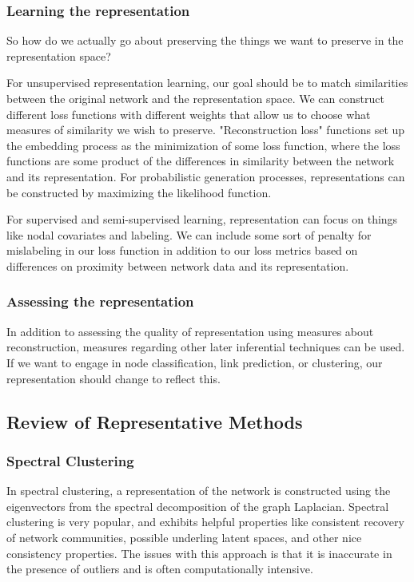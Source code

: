 \documentclass{article}
\begin{document}
\subsubsection{Learning the representation}

So how do we actually go about preserving the things we want to preserve in the representation space? 

For unsupervised representation learning, our goal should be to match similarities between the original network and the representation space. We can construct different loss functions with different weights that allow us to choose what measures of similarity we wish to preserve. "Reconstruction loss" functions set up the embedding process as the minimization of some loss function, where the loss functions are some product of the differences in similarity between the network and its representation. For probabilistic generation processes, representations can be constructed by maximizing the likelihood function.

For supervised and semi-supervised learning, representation can focus on things like nodal covariates and labeling. We can include some sort of penalty for mislabeling in our loss function in addition to our loss metrics based on differences on proximity between network data and its representation. 


\subsubsection{Assessing the representation}

In addition to assessing the quality of representation using measures about reconstruction, measures regarding other later inferential techniques can be used. If we want to engage in node classification, link prediction, or clustering, our representation should change to reflect this. 

\subsection{Review of Representative Methods}

\subsubsection{Spectral Clustering}

In spectral clustering, a representation of the network is constructed using the eigenvectors from the spectral decomposition of the graph Laplacian. Spectral clustering is very popular, and exhibits helpful properties like consistent recovery of network communities, possible underling latent spaces, and other nice consistency properties. The issues with this approach is that it is inaccurate in the presence of outliers and is often computationally intensive.
\end{document}
